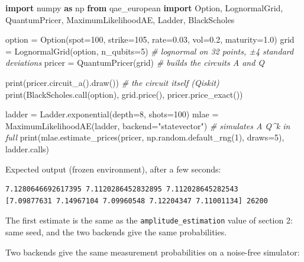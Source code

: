 \documentclass[
  10pt,
]{article}
\newenvironment{Shaded}{}{}
\newcommand{\BuiltInTok}[1]{\textcolor[rgb]{0.00,0.50,0.00}{#1}}
\newcommand{\CommentTok}[1]{\textcolor[rgb]{0.38,0.63,0.69}{\textit{#1}}}
\newcommand{\DecValTok}[1]{\textcolor[rgb]{0.25,0.63,0.44}{#1}}
\newcommand{\FloatTok}[1]{\textcolor[rgb]{0.25,0.63,0.44}{#1}}
\newcommand{\ImportTok}[1]{\textcolor[rgb]{0.00,0.50,0.00}{\textbf{#1}}}
\newcommand{\NormalTok}[1]{#1}
\newcommand{\OperatorTok}[1]{\textcolor[rgb]{0.40,0.40,0.40}{#1}}
\newcommand{\StringTok}[1]{\textcolor[rgb]{0.25,0.44,0.63}{#1}}
\begin{document}
\begin{Shaded}
\begin{Highlighting}[]
\ImportTok{import}\NormalTok{ numpy }\ImportTok{as}\NormalTok{ np}
\ImportTok{from}\NormalTok{ qae\_european }\ImportTok{import}\NormalTok{ Option, LognormalGrid, QuantumPricer, MaximumLikelihoodAE, Ladder, BlackScholes}

\NormalTok{option }\OperatorTok{=}\NormalTok{ Option(spot}\OperatorTok{=}\DecValTok{100}\NormalTok{, strike}\OperatorTok{=}\DecValTok{105}\NormalTok{, rate}\OperatorTok{=}\FloatTok{0.03}\NormalTok{, vol}\OperatorTok{=}\FloatTok{0.2}\NormalTok{, maturity}\OperatorTok{=}\FloatTok{1.0}\NormalTok{)}
\NormalTok{grid }\OperatorTok{=}\NormalTok{ LognormalGrid(option, n\_qubits}\OperatorTok{=}\DecValTok{5}\NormalTok{)        }\CommentTok{\# lognormal on 32 points, ±4 standard deviations}
\NormalTok{pricer }\OperatorTok{=}\NormalTok{ QuantumPricer(grid)                    }\CommentTok{\# builds the circuits A and Q}

\BuiltInTok{print}\NormalTok{(pricer.circuit\_a().draw())                }\CommentTok{\# the circuit itself (Qiskit)}
\BuiltInTok{print}\NormalTok{(BlackScholes.call(option), grid.price(), pricer.price\_exact())}

\NormalTok{ladder }\OperatorTok{=}\NormalTok{ Ladder.exponential(depth}\OperatorTok{=}\DecValTok{8}\NormalTok{, shots}\OperatorTok{=}\DecValTok{100}\NormalTok{)}
\NormalTok{mlae }\OperatorTok{=}\NormalTok{ MaximumLikelihoodAE(ladder, backend}\OperatorTok{=}\StringTok{"statevector"}\NormalTok{)   }\CommentTok{\# simulates A Q\^{}k in full}
\BuiltInTok{print}\NormalTok{(mlae.estimate\_prices(pricer, np.random.default\_rng(}\DecValTok{1}\NormalTok{), draws}\OperatorTok{=}\DecValTok{5}\NormalTok{), ladder.calls)}
\end{Highlighting}
\end{Shaded}

Expected output (frozen environment), after a few seconds:

\begin{verbatim}
7.1280646692617395 7.1120286452832895 7.112028645282543
[7.09877631 7.14967104 7.09960548 7.12204347 7.11001134] 26200
\end{verbatim}

The first estimate is the same as the \texttt{amplitude\_estimation}
value of section 2: same seed, and the two backends give the same
probabilities.

Two backends give the same measurement probabilities on a noise-free
simulator:
\end{document}
